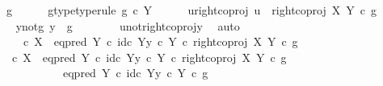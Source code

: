 \begin{isabellebody}
\ g\isanewline
\ \ \ \ \isamarkupfalse%
\ g{\isacharunderscore}{\kern0pt}type{\isacharbrackleft}{\kern0pt}type{\isacharunderscore}{\kern0pt}rule{\isacharbrackright}{\kern0pt}{\isacharcolon}{\kern0pt}\ {\isachardoublequoteopen}g\ {\isasymin}\isactrlsub c\ Y{\isachardoublequoteclose}\isanewline
\ \ \ \ \isamarkupfalse%
\ u{\isacharunderscore}{\kern0pt}right{\isacharunderscore}{\kern0pt}coproj{\isacharcolon}{\kern0pt}\ {\isachardoublequoteopen}u\ {\isacharequal}{\kern0pt}\ right{\isacharunderscore}{\kern0pt}coproj\ X\ Y\ {\isasymcirc}\isactrlsub c\ g{\isachardoublequoteclose}\isanewline
\ \ \ \ \isamarkupfalse%
\ \isamarkupfalse%
\ y{\isacharunderscore}{\kern0pt}not{\isacharunderscore}{\kern0pt}g{\isacharcolon}{\kern0pt}\ {\isachardoublequoteopen}y\ {\isasymnoteq}\ g{\isachardoublequoteclose}\isanewline
\ \ \ \ \ \ \isamarkupfalse%
\ u{\isacharunderscore}{\kern0pt}not{\isacharunderscore}{\kern0pt}right{\isacharunderscore}{\kern0pt}coproj{\isacharunderscore}{\kern0pt}y\ \isamarkupfalse%
\ auto\isanewline
\isanewline
\ \ \ \ \isamarkupfalse%
\ {\isachardoublequoteopen}{\isasymf}\ {\isacharequal}{\kern0pt}\ {\isacharparenleft}{\kern0pt}{\isasymf}\ {\isasymcirc}\isactrlsub c\ {\isasymbeta}\isactrlbsub X\isactrlesub {\isacharparenright}{\kern0pt}\ {\isasymamalg}\ {\isacharparenleft}{\kern0pt}eq{\isacharunderscore}{\kern0pt}pred\ Y\ {\isasymcirc}\isactrlsub c\ {\isasymlangle}id\isactrlsub c\ Y{\isacharcomma}{\kern0pt}y\ {\isasymcirc}\isactrlsub c\ {\isasymbeta}\isactrlbsub Y\isactrlesub {\isasymrangle}{\isacharparenright}{\kern0pt}\ {\isasymcirc}\isactrlsub c\ right{\isacharunderscore}{\kern0pt}coproj\ X\ Y\ {\isasymcirc}\isactrlsub c\ g{\isachardoublequoteclose}\isanewline
\ \ \ \ \isamarkupfalse%
\ {\isacharminus}{\kern0pt}\isanewline
\ \ \ \ \ \ \isamarkupfalse%
\ {\isachardoublequoteopen}{\isacharparenleft}{\kern0pt}{\isasymf}\ {\isasymcirc}\isactrlsub c\ {\isasymbeta}\isactrlbsub X\isactrlesub {\isacharparenright}{\kern0pt}\ {\isasymamalg}\ {\isacharparenleft}{\kern0pt}eq{\isacharunderscore}{\kern0pt}pred\ Y\ {\isasymcirc}\isactrlsub c\ {\isasymlangle}id\isactrlsub c\ Y{\isacharcomma}{\kern0pt}y\ {\isasymcirc}\isactrlsub c\ {\isasymbeta}\isactrlbsub Y\isactrlesub {\isasymrangle}{\isacharparenright}{\kern0pt}\ {\isasymcirc}\isactrlsub c\ right{\isacharunderscore}{\kern0pt}coproj\ X\ Y\ {\isasymcirc}\isactrlsub c\ g\isanewline
\ \ \ \ \ \ \ \ \ \ {\isacharequal}{\kern0pt}\ {\isacharparenleft}{\kern0pt}eq{\isacharunderscore}{\kern0pt}pred\ Y\ {\isasymcirc}\isactrlsub c\ {\isasymlangle}id\isactrlsub c\ Y{\isacharcomma}{\kern0pt}y\ {\isasymcirc}\isactrlsub c\ {\isasymbeta}\isactrlbsub Y\isactrlesub {\isasymrangle}{\isacharparenright}{\kern0pt}\ {\isasymcirc}\isactrlsub c\ g{\isachardoublequoteclose}\isanewline

\end{isabellebody}
